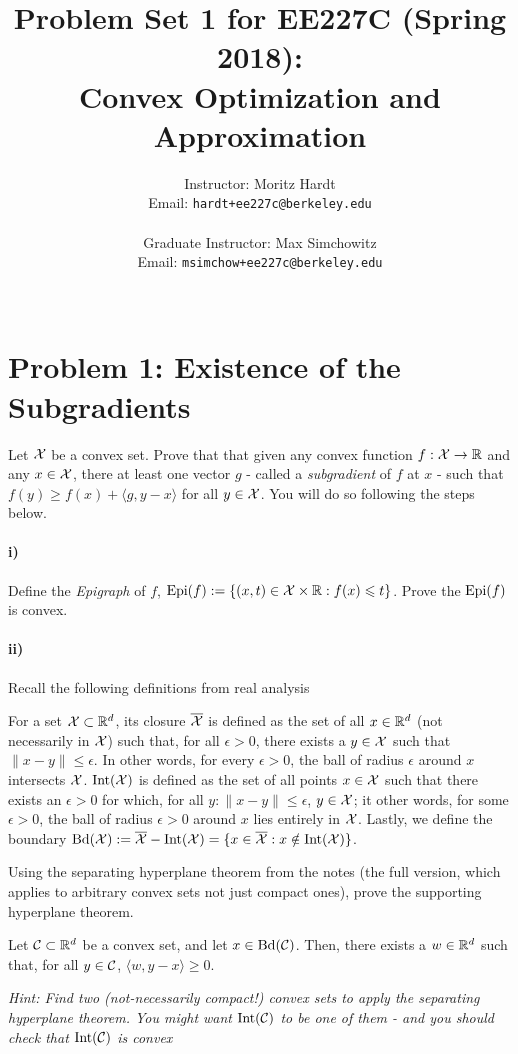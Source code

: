 \documentclass[12pt]{article}
\title{Problem Set 1 for EE227C (Spring 2018):\\
 Convex Optimization and Approximation }
\author{Instructor: Moritz Hardt\\
{\small Email: \tt hardt+ee227c@berkeley.edu}\\ ~\\
Graduate Instructor: Max Simchowitz\\
{\small Email: \tt msimchow+ee227c@berkeley.edu}\\ ~\\
}
\begin{document}
\maketitle




\section*{Problem 1: Existence of the Subgradients}
Let ${\cal X}$ be a convex set. Prove that that given any convex function $f: {\cal X} \to \mathbb{R}$ and any $x \in {\cal X}$, there at least one vector $g$ - called a \emph{subgradient} of $f$ at $x$ - such that $f(y) \ge f(x) + \langle g, y - x \rangle$ for all $y \in {\cal X}$. You will do so following the steps below. 
\paragraph{i)} Define the \emph{Epigraph} of $f$, $\mathrm{Epi}(f) := \{(x,t) \in {\cal X} \times \mathbb{R}: f(x) \leqslant t\}$. Prove the $\mathrm{Epi}(f)$ is convex. 

\paragraph{ii)} Recall the following definitions from real analysis
\begin{definition*} For a set ${\cal X} \subset \mathbb{R}^d$, its closure $\overline{{\cal X}}$ is defined as the set of all $x \in \mathbb{R}^d$ (not necessarily in ${\cal X}$) such that, for all $\epsilon > 0$, there exists a $y \in {\cal X}$ such that $\|x - y\| \le \epsilon$. In other words, for every $\epsilon > 0$, the ball of radius $\epsilon$ around $x$ intersects ${\cal X}$. $\mathrm{Int}({\cal X})$ is defined as the set of all points $x \in {\cal X}$ such that there exists an $\epsilon > 0$ for which, for all $y: \|x-y\| \le \epsilon$, $y \in {\cal X}$; it other words, for some $\epsilon > 0$, the ball of radius $\epsilon > 0$ around $x$ lies entirely in ${\cal X}$. Lastly, we define the boundary $\mathrm{Bd}({\cal X}) := \overline{{\cal X}} - \mathrm{Int}({\cal X}) = \{x \in \overline{{\cal X}} : x \notin \mathrm{Int}({\cal X})\}$. 
\end{definition*}


Using the separating hyperplane theorem from the notes (the full version, which applies to arbitrary convex sets not just compact ones), prove the supporting hyperplane theorem.
\begin{theorem*} Let ${\cal C} \subset \mathbb{R}^d$ be a convex set, and let $x \in \mathrm{Bd}({\cal C})$. Then, there exists a $w \in \mathbb{R}^d$ such that, for all $y \in {\cal C}$, $\langle w, y - x \rangle \ge 0$. 
\end{theorem*}
\emph{Hint:  Find two (not-necessarily compact!) convex sets to apply the separating hyperplane theorem. You might want $\mathrm{Int}({\cal C})$ to be one of them - and you should check that $\mathrm{Int}({\cal C})$ is convex } 
\end{document}
